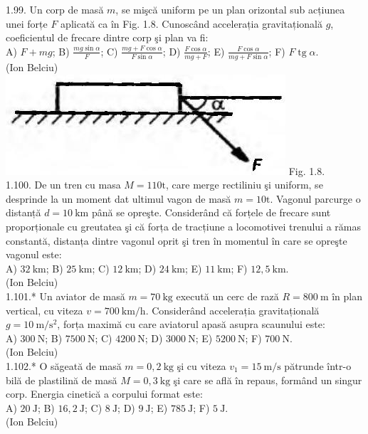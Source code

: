 \documentclass[10pt]{article}
\begin{document}
1.99. Un corp de masă $m$, se mişcă uniform pe un plan orizontal sub acțiunea unei forțe $F$ aplicată ca în Fig. 1.8. Cunoscând accelerația gravitațională $g$, coeficientul de frecare dintre corp şi plan va fi:\\ A) $F+m g$; B) $\frac{m g \sin \alpha}{F}$; C) $\frac{m g+F \cos \alpha}{F \sin \alpha}$; D) $\frac{F \cos \alpha}{m g+F}$; E) $\frac{F \cos \alpha}{m g+F \sin \alpha}$; F) $F \operatorname{tg} \alpha$.\\ (Ion Belciu)\\ \includegraphics[max width=\textwidth, center]{2025_07_01_5b3ff9fa0d508c8e9f17g-024} Fig. 1.8.\\

1.100. De un tren cu masa $M=110 \mathrm{t}$, care merge rectiliniu şi uniform, se desprinde la un moment dat ultimul vagon de masă $m=10 \mathrm{t}$. Vagonul parcurge o distanță $d=10 \mathrm{~km}$ până se opreşte. Considerând că forțele de frecare sunt proporționale cu greutatea şi că forța de tracțiune a locomotivei trenului a rămas constantă, distanța dintre vagonul oprit şi tren în momentul în care se opreşte vagonul este:\\ A) $32 \mathrm{~km}$; B) $25 \mathrm{~km}$; C) $12 \mathrm{~km}$; D) $24 \mathrm{~km}$; E) $11 \mathrm{~km}$; F) $12,5 \mathrm{~km}$.\\ (Ion Belciu)\\

1.101.* Un aviator de masă $m=70 \mathrm{~kg}$ execută un cerc de rază $R=800 \mathrm{~m}$ în plan vertical, cu viteza $v=700 \mathrm{~km} / \mathrm{h}$. Considerând accelerația gravitațională $g=10 \mathrm{~m} / \mathrm{s}^{2}$, forța maximă cu care aviatorul apasă asupra scaunului este:\\ A) $300 \mathrm{~N}$; B) $7500 \mathrm{~N}$; C) $4200 \mathrm{~N}$; D) $3000 \mathrm{~N}$; E) $5200 \mathrm{~N}$; F) $700 \mathrm{~N}$.\\ (Ion Belciu)\\

1.102.* O săgeată de masă $m=0,2 \mathrm{~kg}$ şi cu viteza $v_{1}=15 \mathrm{~m} / \mathrm{s}$ pătrunde într-o bilă de plastilină de masă $M=0,3 \mathrm{~kg}$ şi care se află în repaus, formând un singur corp. Energia cinetică a corpului format este:\\ A) $20 \mathrm{~J}$; B) $16,2 \mathrm{~J}$; C) $8 \mathrm{~J}$; D) $9 \mathrm{~J}$; E) $785 \mathrm{~J}$; F) $5 \mathrm{~J}$.\\ (Ion Belciu)\\
\end{document}
